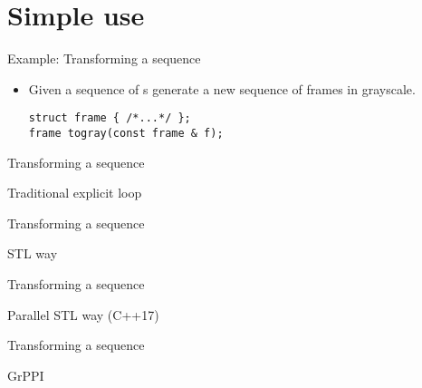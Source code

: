 \section{Simple use}

\begin{frame}[t,fragile]{Example: Transforming a sequence}
\begin{itemize}
  \item Given a sequence of s generate a new
        sequence of frames in grayscale.
\begin{lstlisting}
struct frame { /*...*/ };
frame togray(const frame & f);
\end{lstlisting}
\end{itemize}
\begin{center}

\end{center}
\end{frame}

\begin{frame}[t,fragile]{Transforming a sequence}
\begin{block}{Traditional explicit loop}

\end{block}
\end{frame}

\begin{frame}[t,fragile]{Transforming a sequence}
\begin{block}{STL way}

\end{block}
\end{frame}

\begin{frame}[t,fragile]{Transforming a sequence}
\begin{block}{Parallel STL way (C++17)}

\end{block}
\end{frame}

\begin{frame}[t,fragile]{Transforming a sequence}
\begin{block}{GrPPI}

\end{block}
\end{frame}

